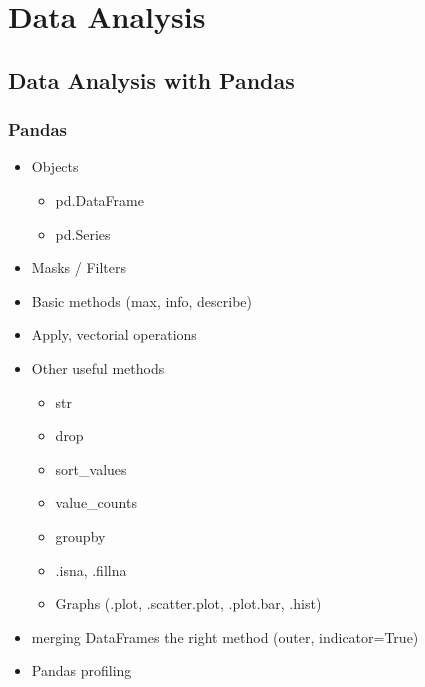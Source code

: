 



\begin{frame}
   \titlepage
\end{frame}



\begin{frame}
   \tableofcontents
\end{frame}

\section{Data Analysis}

\subsection{Data Analysis with Pandas}

\begin{frame}\frametitle{Pandas}
   \begin{itemize}
      \item Objects
      \begin{itemize}
         \item pd.DataFrame
         \item pd.Series
      \end{itemize}
      \item Masks / Filters
      \item Basic methods (max, info, describe)
      \item Apply, vectorial operations
      \item Other useful methods
      \begin{itemize}
         \item str
         \item drop
         \item sort\_values
         \item value\_counts
         \item groupby
         \item .isna, .fillna
         \item Graphs (.plot, .scatter.plot, .plot.bar, .hist)
      \end{itemize}
      \item merging DataFrames the right method (outer, indicator=True)
      \item Pandas profiling
   \end{itemize}
\end{frame}



